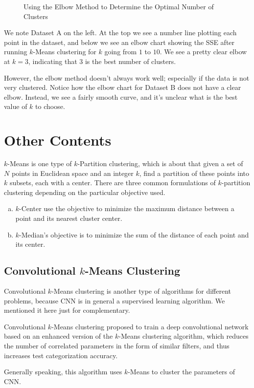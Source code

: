          \begin{figure}[htbp]
		 	\caption{Using the Elbow Method to Determine the Optimal Number of Clusters}
		 \end{figure}

         We note Dataset A on the left. At the top we see a number line plotting each point in the dataset, and below we see an elbow chart showing the SSE after running $k$-Means clustering for $k$ going from $1$ to $10$. We see a pretty clear elbow at $k = 3$, indicating that $3$ is the best number of clusters.

         However, the elbow method doesn't always work well; especially if the data is not very clustered. Notice how the elbow chart for Dataset B does not have a clear elbow. Instead, we see a fairly smooth curve, and it's unclear what is the best value of $k$ to choose.
\section{Other Contents}
$k$-Means is one type of $k$-Partition clustering, which is about that given a set of $N$ points in Euclidean space and an integer $k$, find a partition of these points into $k$ subsets, each with a center. There are three common formulations of $k$-partition clustering depending on the particular objective used. 
\begin{enumerate}[a.]
\item $k$-Center use the objective to minimize the maximum distance between a point and its nearest cluster center.
\item $k$-Median's objective is to minimize the sum of the distance of each point and its center.
\end{enumerate}
\subsection{Convolutional $k$-Means Clustering}
	Convolutional $k$-Means clustering is another type of algorithms for different problems, because CNN is in general a supervised learning algorithm. We mentioned it here just for complementary.

	Convolutional $k$-Means clustering proposed to train a deep convolutional network based on an enhanced version of the $k$-Means clustering algorithm, which reduces the number of correlated parameters in the form of similar filters, and thus increases test categorization accuracy.

	Generally speaking, this algorithm uses $k$-Means to cluster the parameters of CNN.
